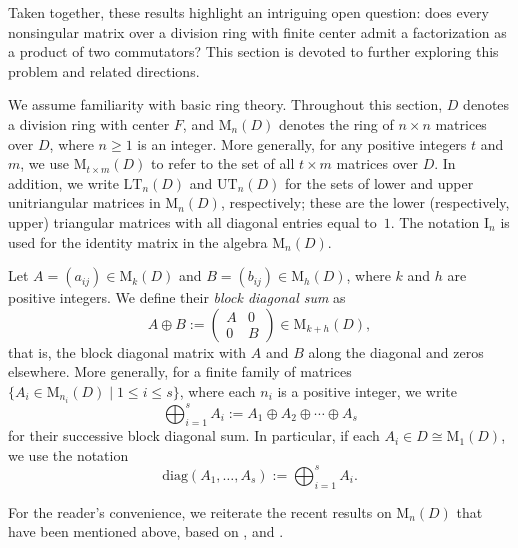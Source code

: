 \documentclass[11pt]{article}
\theoremstyle{definition}
\begin{document}
{{{{				Taken together, these results highlight an intriguing open question: does every nonsingular matrix over a division ring with finite center admit a factorization as a product of two  commutators? This section is devoted to further exploring this problem and related directions.
				
				We assume familiarity with basic ring theory. Throughout this section, $D$ denotes a division ring with center $F$, and $\mathrm{M}_n(D)$ denotes the ring of $n\times n$ matrices over $D$, where $n\geq1$ is an integer. More generally, for any positive integers $t$ and $m$, we use $\mathrm{M}_{t \times m}(D)$ to refer to the set of all $t \times m$ matrices over $D$.  In addition, we write $\mathrm{LT}_n(D)$ and $\mathrm{UT}_n(D)$ for the sets of lower and upper unitriangular matrices in $\mathrm{M}_n(D)$, respectively; these are the lower (respectively, upper) triangular matrices with all diagonal entries equal to~$1$. The notation $\mathrm{I}_n$ is used for the identity matrix in the algebra $\mathrm{M}_n(D)$.
				
				
				Let \( A = (a_{ij}) \in \mathrm{M}_k(D) \) and \( B = (b_{ij}) \in \mathrm{M}_h(D) \), where \( k \) and \( h \) are positive integers. We define their \emph{block diagonal sum} as
				\[
				A \oplus B := \begin{pmatrix}
					A & 0 \\
					0 & B
				\end{pmatrix} \in \mathrm{M}_{k+h}(D),
				\]
				that is, the block diagonal matrix with \(A\) and \(B\) along the diagonal and zeros elsewhere. More generally, for a finite family of matrices \( \{ A_i \in \mathrm{M}_{n_i}(D) \mid 1 \leq i \leq s \} \), where each \(n_i\) is a positive integer, we write
				\[
				\bigoplus_{i=1}^s A_i := A_1 \oplus A_2 \oplus \cdots \oplus A_s
				\]
				for their successive block diagonal sum. In particular, if each \( A_i \in D \cong \mathrm{M}_1(D) \), we use the notation
				\[
				\mathrm{diag}(A_1, \dots, A_s) := \bigoplus_{i=1}^s A_i.
				\]
				
				
				For the reader’s convenience, we reiterate the recent results on $\mathrm{M}_n(D)$ that have been mentioned above, based on \cite[Theorem 4.1]{Pa_Botha_97}, and \cite[Lemma 4.3, Theorems 3.9 and 4.4, Propositions 4.2 and 4.7]{Pa_Bre_25}.
				
}}}}
\end{document}
